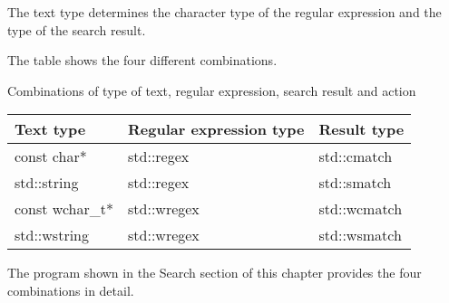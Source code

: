 The text type determines the character type of the regular expression and the type of the search result.

The table shows the four different combinations.

\begin{center}
Combinations of type of text, regular expression, search result and action
\end{center}

\begin{longtable}[c]{|l|l|l|}
\hline
\textbf{Text type} & \textbf{Regular expression type} & \textbf{Result type} \\ \hline
\endfirsthead
%
\endhead
%
const char*        & std::regex                       & std::cmatch          \\ \hline
std::string        & std::regex                       & std::smatch          \\ \hline
const wchar\_t*    & std::wregex                      & std::wcmatch         \\ \hline
std::wstring       & std::wregex                      & std::wsmatch         \\ \hline
\end{longtable}


The program shown in the Search section of this chapter provides the four combinations in detail.
















